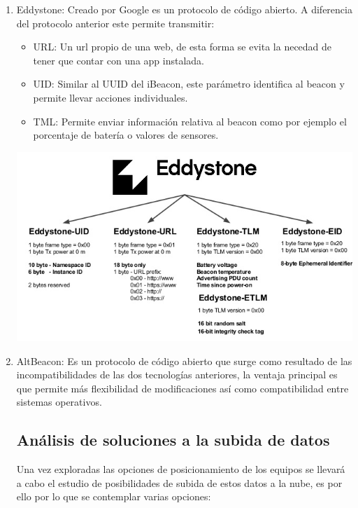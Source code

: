 \documentclass[a4paper ,12pt, onecolumn]{article}
\begin{document}
\begin{enumerate}
                \item Eddystone: Creado por Google es un protocolo de código abierto. A diferencia del protocolo anterior este 
                permite transmitir:
                \begin{itemize}
                    \item URL: Un url propio de una web, de esta forma se evita la necedad de tener que contar con una app instalada.
                    \item UID: Similar al UUID del iBeacon, este parámetro identifica al beacon y permite llevar acciones individuales.
                    \item TML: Permite enviar información relativa al beacon como por ejemplo el porcentaje de batería o valores de sensores.
                \end{itemize}
                \begin{center}
                    \includegraphics[scale=0.4]{tipos_beacon_edison.PNG}
                \end{center}
                \item AltBeacon: Es un protocolo de código abierto que surge como resultado de las incompatibilidades de las dos 
                tecnologías anteriores, la ventaja principal es que permite más flexibilidad de modificaciones así como compatibilidad 
                entre sistemas operativos.
    \subsection{Análisis de soluciones a la subida de datos}
        Una vez exploradas las opciones de posicionamiento de los equipos se llevará a cabo el estudio de posibilidades de subida de estos datos
        a la nube, es por ello por lo que se contemplar varias opciones:

\end{enumerate}
\end{document}
